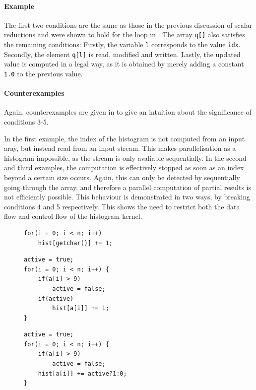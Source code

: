     \paragraph*{Example}
    The first two conditions are the same as those in the previous discussion of
    scalar reductions and were shown to hold for the loop in
    .
    The array \texttt{q[]} also satisfies the remaining conditions:
    Firstly, the variable \texttt{l} corresponds to the value \texttt{idx}.
    Secondly, the element \texttt{q[l]} is read, modified and written.
    Lastly, the updated value is computed in a legal way, as it is obtained by
    merely adding a constant \texttt{1.0} to the previous value.

    \paragraph*{Counterexamples}
    Again, counterexamples are given in  to give an
    intuition about the significance of conditions 3-5.

    In the first example, the index of the histogram is not computed from an
    input aray, but instead read from an input stream.
    This makes parallelisation as a histogram impossible, as the stream is only
    avaliable sequentially.
    In the second and third examples, the computation is effectively stopped as
    soon as an index beyond a certain size occurs.
    Again, this can only be detected by sequentially going through the array,
    and therefore a parallel computation of partial results is not efficiently
    possible.
    This behaviour is demonstrated in two ways, by breaking conditions 4 and 5
    respectively.
    This shows the need to restrict both the data flow and control flow of the
    histogram kernel.

\begin{figure}[t]
\begin{lstlisting}[language=MyCpp]
for(i = 0; i < n; i++)
    hist[getchar()] += 1;
\end{lstlisting}
\begin{lstlisting}[language=MyCpp]
active = true;
for(i = 0; i < n; i++) {
    if(a[i] > 9)
        active = false;
    if(active)
        hist[a[i]] += 1;
}
\end{lstlisting}
\begin{lstlisting}[language=MyCpp,label={counterexamples2},caption=
   {Counterexamples to the last three conditions:
    None of these computations can be parallelised as histograms.
    The final two example loops implement the same functionality.}]
active = true;
for(i = 0; i < n; i++) {
    if(a[i] > 9)
        active = false;
    hist[a[i]] += active?1:0;
}
\end{lstlisting}
\end{figure}

